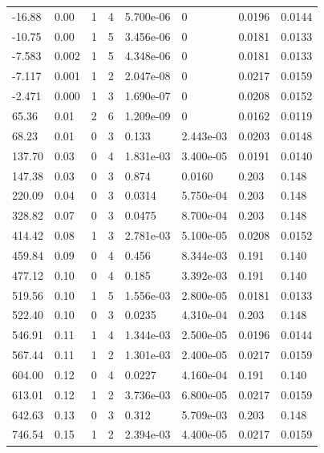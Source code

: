\documentclass[preview]{standalone}
\begin{document}
{{\begin{tabular}{L{1.2cm}C{1.2cm} C{0.3cm}C{0.5cm} C{1.4cm}C{1.4cm} C{1.4cm}C{1.4cm}}
  -16.88  &  0.00  & 1     &  4 &  5.700e-06  & 0  & 0.0196 &  0.0144   \\ 
  -10.75  &  0.00  & 1     &  5 &  3.456e-06  & 0  & 0.0181 &  0.0133   \\ 
  -7.583  &  0.002  & 1     &  5 &  4.348e-06  & 0  & 0.0181 &  0.0133   \\ 
  -7.117  &  0.001  & 1     &  2 &  2.047e-08  & 0  & 0.0217 &  0.0159   \\ 
  -2.471  &  0.000  & 1     &  3 &  1.690e-07  & 0  & 0.0208 &  0.0152   \\ 
  65.36  &  0.01  & 2     &  6 &  1.209e-09  & 0  & 0.0162 &  0.0119   \\ 
  68.23  &  0.01  & 0     &  3 &  0.133  & 2.443e-03  & 0.0203 &  0.0148   \\ 
  137.70  &  0.03  & 0     &  4 &  1.831e-03  & 3.400e-05  & 0.0191 &  0.0140   \\ 
  147.38  &  0.03  & 0     &  3 &  0.874  & 0.0160  & 0.203 &  0.148   \\ 
  220.09  &  0.04  & 0     &  3 &  0.0314  & 5.750e-04  & 0.203 &  0.148   \\ 
  328.82  &  0.07  & 0     &  3 &  0.0475  & 8.700e-04  & 0.203 &  0.148   \\ 
  414.42  &  0.08  & 1     &  3 &  2.781e-03  & 5.100e-05  & 0.0208 &  0.0152   \\ 
  459.84  &  0.09  & 0     &  4 &  0.456  & 8.344e-03  & 0.191 &  0.140   \\ 
  477.12  &  0.10  & 0     &  4 &  0.185  & 3.392e-03  & 0.191 &  0.140   \\ 
  519.56  &  0.10  & 1     &  5 &  1.556e-03  & 2.800e-05  & 0.0181 &  0.0133   \\ 
  522.40  &  0.10  & 0     &  3 &  0.0235  & 4.310e-04  & 0.203 &  0.148   \\ 
  546.91  &  0.11  & 1     &  4 &  1.344e-03  & 2.500e-05  & 0.0196 &  0.0144   \\ 
  567.44  &  0.11  & 1     &  2 &  1.301e-03  & 2.400e-05  & 0.0217 &  0.0159   \\ 
  604.00  &  0.12  & 0     &  4 &  0.0227  & 4.160e-04  & 0.191 &  0.140   \\ 
  613.01  &  0.12  & 1     &  2 &  3.736e-03  & 6.800e-05  & 0.0217 &  0.0159   \\ 
  642.63  &  0.13  & 0     &  3 &  0.312  & 5.709e-03  & 0.203 &  0.148   \\ 
  746.54  &  0.15  & 1     &  2 &  2.394e-03  & 4.400e-05  & 0.0217 &  0.0159   \\ 

\end{tabular}}}
\end{document}
